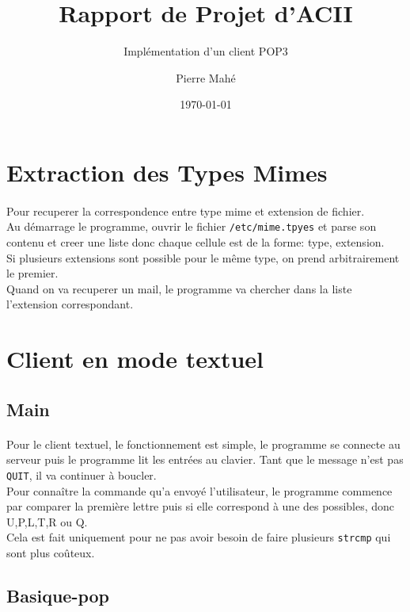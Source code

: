 \documentclass[a4paper, titlepage, oneside, 12pt]{article}%
\title{Rapport de Projet d'ACII}
\subtitle{Implémentation d'un client POP3}
\author{Pierre Mahé}
\date{\today}
\begin{document}
 
\maketitle 

\newpage

\section{Extraction des Types Mimes}
\paragraph{}
Pour recuperer la correspondence entre type mime et extension de fichier.\\
Au démarrage le programme, ouvrir le fichier \texttt{/etc/mime.tpyes} et parse son contenu et creer une liste donc chaque cellule est de la forme: type, extension.\\
Si plusieurs extensions sont possible pour le même type, on prend arbitrairement le premier.\\
Quand on va recuperer un mail, le programme va chercher dans la liste l'extension correspondant.

\section{Client en mode textuel}
\subsection{Main}
\paragraph{}
Pour le client textuel, le fonctionnement est simple, le programme se connecte au serveur puis le programme lit les entrées au clavier.
Tant que le message n'est pas \texttt{QUIT}, il va continuer à boucler.\\
Pour connaître la commande qu'a envoyé l'utilisateur, le programme commence par comparer la première lettre puis si elle correspond à une des possibles, donc U,P,L,T,R ou Q.\\
Cela est fait uniquement pour ne pas avoir besoin de faire plusieurs \texttt{strcmp} qui sont plus coûteux.
\subsection{Basique-pop}
\end{document}
